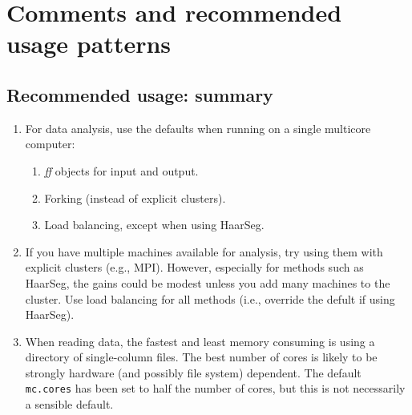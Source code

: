 \documentclass[a4paper,11pt]{article}
\begin{document}
            





\clearpage
\section{Comments and recommended usage patterns}
\label{commentsend}


\subsection{Recommended usage: summary}\label{comments-summary}


\begin{enumerate}
\item For data analysis, use the defaults when running on a single
  multicore computer:
  \begin{enumerate}
  \item \textit{ff} objects for input and output.
  \item Forking (instead of explicit clusters).
  \item Load balancing, except when using HaarSeg.
  \end{enumerate}

\item If you have multiple machines available for analysis, try using them
  with explicit clusters (e.g., MPI). However, especially for methods such
  as HaarSeg, the gains could be modest unless you add many machines to
  the cluster. Use load balancing for all methods (i.e., override the
  defult if using HaarSeg).

\item When reading data, the fastest and least memory consuming is using a
  directory of single-column files. The best number of cores is likely to
  be strongly hardware (and possibly file system) dependent. The default
  \texttt{mc.cores} has been set to half the number of cores, but this is
  not necessarily a sensible default.
\end{enumerate}
\end{document}
